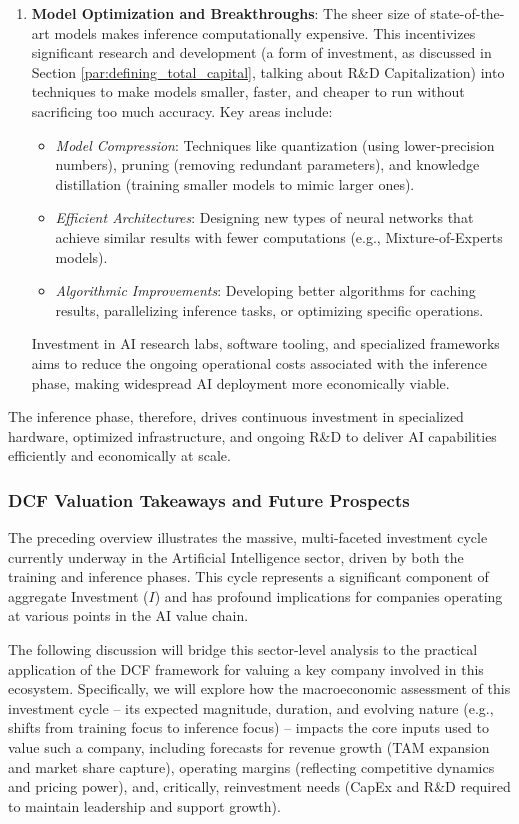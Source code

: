 \begin{enumerate}
    \item \textbf{Model Optimization and Breakthroughs}: The sheer size of state-of-the-art models makes inference computationally expensive. This incentivizes significant research and development (a form of investment, as discussed in Section \ref{par:defining_total_capital}, talking about R\&D Capitalization) into techniques to make models smaller, faster, and cheaper to run without sacrificing too much accuracy. Key areas include:
          \begin{itemize}
              \item \textit{Model Compression}: Techniques like quantization (using lower-precision numbers), pruning (removing redundant parameters), and knowledge distillation (training smaller models to mimic larger ones).
              \item \textit{Efficient Architectures}: Designing new types of neural networks that achieve similar results with fewer computations (e.g., Mixture-of-Experts models).
              \item \textit{Algorithmic Improvements}: Developing better algorithms for caching results, parallelizing inference tasks, or optimizing specific operations.
          \end{itemize}
          Investment in AI research labs, software tooling, and specialized frameworks aims to reduce the ongoing operational costs associated with the inference phase, making widespread AI deployment more economically viable.
\end{enumerate}
The inference phase, therefore, drives continuous investment in specialized hardware, optimized infrastructure, and ongoing R\&D to deliver AI capabilities efficiently and economically at scale.

\subsubsection{DCF Valuation Takeaways and Future Prospects} \label{subsubsec:ai_dcf_takeaways}
The preceding overview illustrates the massive, multi-faceted investment cycle currently underway in the Artificial Intelligence sector, driven by both the training and inference phases. This cycle represents a significant component of aggregate Investment (\(I\)) and has profound implications for companies operating at various points in the AI value chain.

The following discussion will bridge this sector-level analysis to the practical application of the DCF framework for valuing a key company involved in this ecosystem. Specifically, we will explore how the macroeconomic assessment of this investment cycle – its expected magnitude, duration, and evolving nature (e.g., shifts from training focus to inference focus) – impacts the core inputs used to value such a company, including forecasts for revenue growth (TAM expansion and market share capture), operating margins (reflecting competitive dynamics and pricing power), and, critically, reinvestment needs (CapEx and R\&D required to maintain leadership and support growth).

